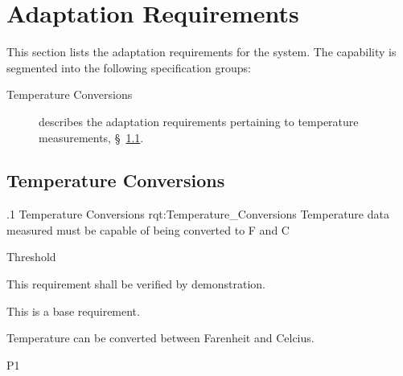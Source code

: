 \KNEADSECTIONNEWPAGE
\section{Adaptation Requirements}
\label{lab:sec_Adaptation}
% 

This section lists the adaptation requirements for the system. The \ThisSys capability is segmented into the following specification groups:

\begin{description}
	\item [Temperature Conversions] describes the adaptation requirements pertaining to temperature measurements, \S~\ref{loc:ADAPTATION_TEMP}.
\end{description}

\KNEADSUBSECTIONNEWPAGE
\subsection{Temperature Conversions}
\label{loc:ADAPTATION_TEMP}

\ONERQMTV
{\RqtNumberBase.1}
{Temperature Conversions}
{rqt:Temperature_Conversions}
{Temperature data measured must be capable of being converted to \degree F and \degree C}
{
	\item [All Phases] Threshold
}
{This requirement shall be verified by demonstration.}
{
\item [N/A] This is a base requirement.
}
{
	\item Temperature can be converted between Farenheit and Celcius.
}
{P1}
